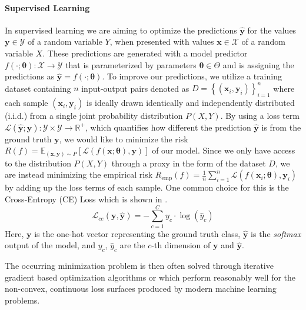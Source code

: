 \paragraph{Supervised Learning}
In supervised learning we are aiming to optimize the predictions $\mathbf{\hat{y}}$ for the values $\mathbf{y} \in \mathcal{Y}$ of a random variable $Y$, when presented with values $\mathbf{x} \in \mathcal{X}$ of a random variable $X$. These predictions are generated with a model predictor $f(\cdot;\boldsymbol{\theta}): \mathcal{X} \rightarrow \mathcal{Y}$ that is parameterized by parameters $\boldsymbol{\theta} \in \Theta$  and is assigning the predictions as $\mathbf{\hat{y}}=f(\cdot;\boldsymbol{\theta})$. To improve our predictions, we utilize a training dataset containing $n$ input-output pairs denoted as $D=\left\{\left(\mathbf{x}_{i}, \mathbf{y}_{i}\right)\right\}_{i=1}^{n}$ where each sample $(\mathbf{x}_i,\mathbf{y}_i)$ is ideally drawn identically and independently distributed (i.i.d.) from a single joint probability distribution $P(X,Y)$. By using a loss term $\mathcal{L} (\mathbf{\hat{y}};\mathbf{y}): \mathcal{Y} \times \mathcal{Y} \rightarrow \mathbb{R}^{+}$, which quantifies how different the prediction $\mathbf{\hat{y}}$ is from the ground truth $\mathbf{y}$, we would like to minimize the risk $R(f) = \mathbb{E}_{(\mathbf{x}, \mathbf{y}) \sim P}[\mathcal{L}(f(\mathbf{x}; \boldsymbol{\theta}), \mathbf{y})]$ of our model. Since we only have access to the distribution $P(X,Y)$ through a proxy in the form of the dataset $D$, we are instead minimizing the empirical risk $R_{\mathrm{emp}}(f)=\frac{1}{n} \sum_{i=1}^n \mathcal{L}\left(f\left(\mathbf{x}_{i};\boldsymbol{\theta}\right), \mathbf{y}_{i}\right)$ by adding up the loss terms of each sample. One common choice for this is the Cross-Entropy (CE) Loss which is shown in .
\begin{equation}
\label{eq:cross_entropy}
    \mathcal{L}_{ce}(\mathbf{y}, \mathbf{\hat{y}})=-\sum_{c=1}^{C} y_c \cdot \log \left(\hat{y}_c\right)
\end{equation}
Here, $\mathbf{y}$ is the one-hot vector representing the ground truth class, $\mathbf{\hat{y}}$ is the \emph{softmax} output of the model, and $y_c$, $\hat{y}_c$ are the $c$-th dimension of $\mathbf{y}$ and $\mathbf{\hat{y}}$.

The occurring minimization problem is then often solved through iterative gradient based optimization algorithms \eg \sgd{} \citep{Robbins1951} or \adam \citep{Kingma2015} which perform reasonably well for the non-convex, continuous loss surfaces produced by modern machine learning problems.

